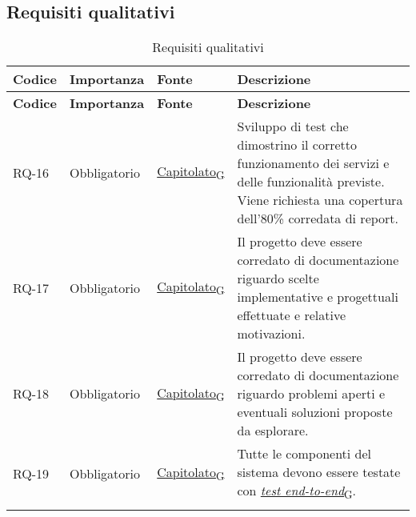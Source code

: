 \subsection{Requisiti qualitativi}
\begin{longtable}{|>{\centering\arraybackslash}m{}|>{\centering\arraybackslash}m{}|>{\centering\arraybackslash}m{}|>{\centering\arraybackslash}m{}|}
	\hline
	\textbf{Codice} & \textbf{Importanza} & \textbf{Fonte} & \textbf{Descrizione}                                                                                                                                                                            \\\hline
	\endfirsthead
	\hline
	\textbf{Codice} & \textbf{Importanza} & \textbf{Fonte} & \textbf{Descrizione}                                                                                                                                                                            \\\hline
	\endhead
	RQ-16           & Obbligatorio        & \href{https://7last.github.io/docs/rtb/documentazione-interna/glossario\#capitolato}{Capitolato\textsubscript{G}}     & Sviluppo di test che dimostrino il corretto funzionamento dei servizi e delle funzionalità previste. Viene richiesta una copertura dell'80\% corredata di report.                               \\\hline
	RQ-17           & Obbligatorio        & \href{https://7last.github.io/docs/rtb/documentazione-interna/glossario\#capitolato}{Capitolato\textsubscript{G}}     & Il progetto deve essere corredato di documentazione riguardo scelte implementative e progettuali effettuate e relative motivazioni.                                                             \\\hline
	RQ-18           & Obbligatorio        & \href{https://7last.github.io/docs/rtb/documentazione-interna/glossario\#capitolato}{Capitolato\textsubscript{G}}     & Il progetto deve essere corredato di documentazione riguardo problemi aperti e eventuali soluzioni proposte da esplorare.                                                                       \\\hline
	RQ-19           & Obbligatorio        & \href{https://7last.github.io/docs/rtb/documentazione-interna/glossario\#capitolato}{Capitolato\textsubscript{G}}     & Tutte le componenti del sistema devono essere testate con \href{https://7last.github.io/docs/rtb/documentazione-interna/glossario\#test-end-to-end}{\textit{test end-to-end}\textsubscript{G}}. \\\hline
	\caption{Requisiti qualitativi}
	\label{table:2}
\end{longtable}


